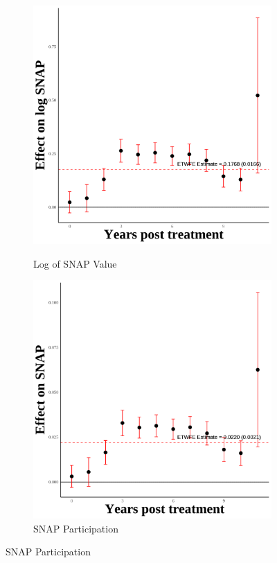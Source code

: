 \documentclass[12pt,english]{article}
\begin{document}
\begin{figure}[H]
  \begin{subfigure}[b]{0.3\textwidth}
    \centering
    \caption{Log of SNAP Value}
    \includegraphics[width=\linewidth]{figures/plot20-ln_snap_event_study-second.png}
    \label{fig:ln-snap-second}
  \end{subfigure}
  \hfill
  \begin{subfigure}[b]{0.3\textwidth}
    \centering
    \caption{SNAP Participation}
    \includegraphics[width=\linewidth]{figures/plot21-snap_event_study-second.png}

\end{subfigure}
\end{figure}
\end{document}
